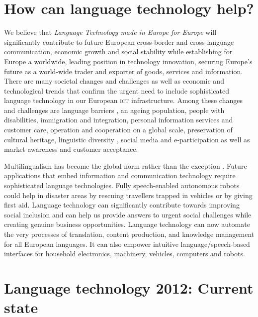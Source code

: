 \documentclass[output=paper]{LSP/langsci}
\begin{document}
\section{How can language technology help?}
\label{sec:how-can-language-technology-help}

We believe that \emph{Language Technology made in Europe for Europe}
will significantly contribute to future European cross-border and
cross-language communication, economic growth and social stability
while establishing for Europe a worldwide, leading position in
technology innovation, securing Europe's future as a world-wide trader
and exporter of goods, services and information. There are many
societal changes and challenges as well as economic and technological
trends that confirm the urgent need to include sophisticated language
technology in our European \textsc{ict} infrastructure. Among these changes and
challenges are language barriers \citep{EC4}, an ageing population,
people with disabilities, immigration and integration, personal
information services and customer care, operation and cooperation on a
global scale, preservation of cultural heritage, linguistic diversity
\citep{worldsummit2003,Unesco2}, social media and e-participation as
well as market awareness and customer acceptance. \largerpage %

\newpage
Multilingualism has become the global norm rather than the exception
\citep{maaya2012}. Future applications that embed information and
communication technology require sophisticated language
technologies. Fully speech-enabled autonomous robots could help in
disaster areas by rescuing travellers trapped in vehicles or by giving
first aid. Language technology can significantly contribute towards
improving social inclusion and can help us provide answers to urgent
social challenges while creating genuine business opportunities.
Language technology can now automate the very processes of
translation, content production, and knowledge management for all
European languages. It can also empower intuitive
language/speech-based interfaces for household electronics, machinery,
vehicles, computers and robots.

\section{Language technology 2012: Current state}
\label{sec:LT-2012}
\end{document}
